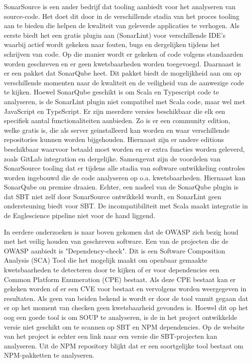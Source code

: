 SonarSource is een ander bedrijf dat tooling aanbiedt voor het analyseren van source-code. Het doet dit door in de verschillende stadia van het proces tooling aan te bieden die helpen de kwaliteit van geleverde applicaties te verhogen. Als eerste biedt het een gratis plugin aan (SonarLint) voor verschillende IDE's waarbij actief wordt gekeken naar fouten, bugs en dergelijken tijdens het schrijven van code. Op die manier wordt er gekeken of code volgens standaarden worden geschreven en er geen kwetsbaarheden worden toegevoegd. Daarnaast is er een pakket dat SonarQube heet. Dit pakket biedt de mogelijkheid aan om op verschillende momenten naar de kwaliteit en de veiligheid van de aanwezige code te kijken. Hoewel SonarQube geschikt is om Scala en Typescript code te analyseren, is de SonarLint plugin niet compatibel met Scala code, maar wel met JavaScript en TypeScript. Er zijn meerdere versies beschikbaar die elk een specifiek aantal functionaliteiten aanbieden. Zo is er een community edition, welke gratis is, die als server geinstalleerd kan worden en waar verschillende repositories kunnen worden bijgehouden. Hiernaast zijn er andere editions beschikbaar waarvoor betaald moet worden en er extra functies worden geleverd, zoals GitLab integration en dergelijke. Samengevat zijn de voordelen van SonarSource tooling dat er tijdens alle stadia van software ontwikkeling controles worden ingebouwd die de code analyseren op o.a. kwetsbaarheden. Hiernaast kan SonarQube on premise draaien. Echter, een nadeel van de SonarQube plugin is dat SBT niet zelf door SonarSource ontwikkeld wordt, en SonarLint geen ondersteuning biedt voor SBT. De incompatibiliteit met Scala maakt integratie in de Eaglescience pipeline niet voor de hand liggend.

In eerdere onderzoeken is naar boven gekomen dat de OWASP zich bezig houd met het veilig houden van geschreven software. Een van de projecten die de OWASP aanbiedt is "Dependency-check". Dit is een Software Composition Analysis (SCA) Tool die het mogelijk maakt om openbaar gemaakte kwetsbaarheden te detecteren door te kijken of er voor dependencies een Common Platform Enumeration (CPE) bestaat. Als deze CPE bestaat kan er gekeken worden of er een CVE voor bestaat en vervolgens worden weergegeven in resultaten. Als geen van beiden bekend is wordt er door de tool vanuit gegaan dat er op het moment van checken geen kwetsbaarheid gevonden is. Hoewel dit op het oog een goede tool is om SOUP te analyseren, is de in het project ontwikkelde versie niet geschikt om te scannen op SBT en NPM dependencies. Op de website van het project is echter een link naar een versie die SBT-projecten kan analyseren. Uit de NPM repository blijkt dat er een soortgelijke tool bestaat om NPM-pakketten te analyseren.

